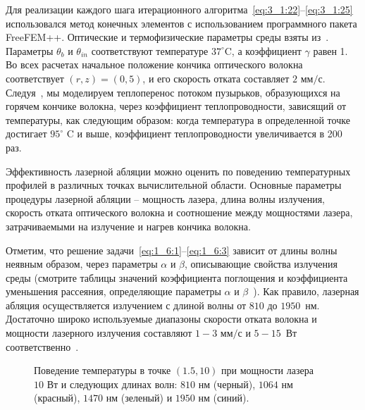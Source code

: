 Для реализации каждого шага итерационного
алгоритма~\eqref{eq:3_1:22}--\eqref{eq:3_1:25}
использовался метод конечных элементов с использованием
программного пакета FreeFEM++\cite{Hecht2012}.
Оптические и термофизические параметры среды
взяты из~\cite{van2014optical}.
Параметры $\theta_{b}$ и $\theta_{i n}$ соответствуют
температуре $37^{\circ} \text{C}$, а коэффициент $\gamma$ равен 1.
Во всех расчетах начальное положение кончика оптического волокна
соответствует $(r, z)=(0,5)$, и его скорость отката составляет
$2 \text{~мм} / \text{с}$.
Следуя~\cite{van2014optical, Some_Poluektova2014},
мы моделируем теплоперенос потоком пузырьков,
образующихся на горячем кончике волокна, через коэффициент теплопроводности,
зависящий от температуры, как следующим образом: когда температура
в определенной точке достигает $95^{\circ}\text{~C}$ и выше,
коэффициент теплопроводности увеличивается в 200 раз.

Эффективность лазерной абляции можно оценить по поведению
температурных профилей в различных точках вычислительной области.
Основные параметры процедуры лазерной абляции -- мощность лазера,
длина волны излучения, скорость отката оптического волокна и
соотношение между мощностями лазера, затрачиваемыми на
излучение и нагрев кончика волокна.

Отметим, что решение задачи~\eqref{eq:1_6:1}--\eqref{eq:1_6:3} зависит от длины
волны неявным образом, через параметры $\alpha$ и $\beta$,
описывающие свойства излучения среды (смотрите таблицы значений коэффициента
поглощения и коэффициента уменьшения рассеяния, определяющие параметры
$\alpha$ и $\beta$~\cite{van2014optical, Some_Poluektova2014}).
Как правило, лазерная абляция осуществляется излучением с длиной волны
от \(810\) до $1950$~нм.
Достаточно широко используемые диапазоны скорости отката волокна и мощности
лазерного излучения составляют $1-3\text{~мм}/\text{с}$
и $5-15$~Вт
соответственно~\cite{
    Mathematical_Mordon2006,
    van2014optical,
    Some_Poluektova2014}.


\begin{figure}[h!t]
    \caption{Поведение температуры в точке $(1.5,10)$
        при мощности лазера $10\text{~Вт}$ и следующих длинах волн:
        $810\text{~нм}$ (черный), $1064\text{~нм}$ (красный),
        $1470\text{~нм}$ (зеленый) и $1950\text{~нм}$ (синий).}
    \label{fig:4_3:4}
\end{figure}

